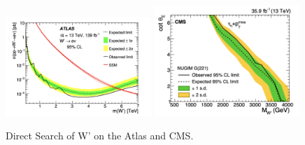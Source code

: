 \begin{figure}
    \centering
    \includegraphics[width=0.49\textwidth]{chapters/RelatedWorks/sectionBSM/figures/WPrime_search0.png} 
    \includegraphics[width=0.49\textwidth]{chapters/RelatedWorks/sectionBSM/figures/WPrime_search.png} 
    \caption{Direct Search of W' on the Atlas and CMS.}
    \label{fig:relatedWorks:bsm:WPrime:directSearch}
\end{figure}






\FloatBarrier






